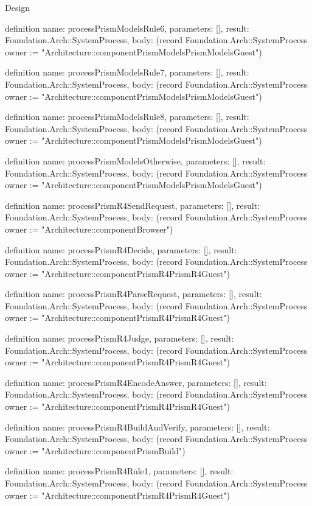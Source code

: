 \begin{lexlean}{Design}
\begin{semanticmodule}
definition{
  name: processPrismModelsRule6,
  parameters: [],
  result: Foundation.Arch::SystemProcess,
  body: (record Foundation.Arch::SystemProcess {owner := "Architecture::componentPrismModelsPrismModelsGuest"})
}

definition{
  name: processPrismModelsRule7,
  parameters: [],
  result: Foundation.Arch::SystemProcess,
  body: (record Foundation.Arch::SystemProcess {owner := "Architecture::componentPrismModelsPrismModelsGuest"})
}

definition{
  name: processPrismModelsRule8,
  parameters: [],
  result: Foundation.Arch::SystemProcess,
  body: (record Foundation.Arch::SystemProcess {owner := "Architecture::componentPrismModelsPrismModelsGuest"})
}

definition{
  name: processPrismModelsOtherwise,
  parameters: [],
  result: Foundation.Arch::SystemProcess,
  body: (record Foundation.Arch::SystemProcess {owner := "Architecture::componentPrismModelsPrismModelsGuest"})
}

definition{
  name: processPrismR4SendRequest,
  parameters: [],
  result: Foundation.Arch::SystemProcess,
  body: (record Foundation.Arch::SystemProcess {owner := "Architecture::componentBrowser"})
}

definition{
  name: processPrismR4Decide,
  parameters: [],
  result: Foundation.Arch::SystemProcess,
  body: (record Foundation.Arch::SystemProcess {owner := "Architecture::componentPrismR4PrismR4Guest"})
}

definition{
  name: processPrismR4ParseRequest,
  parameters: [],
  result: Foundation.Arch::SystemProcess,
  body: (record Foundation.Arch::SystemProcess {owner := "Architecture::componentPrismR4PrismR4Guest"})
}

definition{
  name: processPrismR4Judge,
  parameters: [],
  result: Foundation.Arch::SystemProcess,
  body: (record Foundation.Arch::SystemProcess {owner := "Architecture::componentPrismR4PrismR4Guest"})
}

definition{
  name: processPrismR4EncodeAnswer,
  parameters: [],
  result: Foundation.Arch::SystemProcess,
  body: (record Foundation.Arch::SystemProcess {owner := "Architecture::componentPrismR4PrismR4Guest"})
}

definition{
  name: processPrismR4BuildAndVerify,
  parameters: [],
  result: Foundation.Arch::SystemProcess,
  body: (record Foundation.Arch::SystemProcess {owner := "Architecture::componentPrismBuild"})
}

definition{
  name: processPrismR4Rule1,
  parameters: [],
  result: Foundation.Arch::SystemProcess,
  body: (record Foundation.Arch::SystemProcess {owner := "Architecture::componentPrismR4PrismR4Guest"})
}


\end{semanticmodule}
\end{lexlean}
